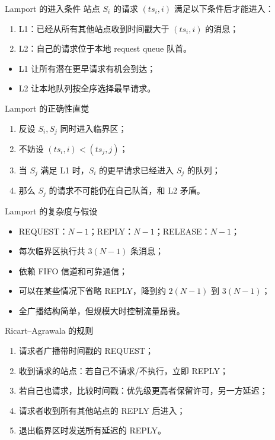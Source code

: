 \documentclass[UTF8,fontset=none,aspectratio=169,10pt]{beamer}
\begin{document}
\begin{frame}{Lamport 的进入条件}
站点 $S_i$ 的请求 $(ts_i,i)$ 满足以下条件后才能进入：
\begin{enumerate}
  \item L1：已经从所有其他站点收到时间戳大于 $(ts_i,i)$ 的消息；
  \item L2：自己的请求位于本地 request queue 队首。
\end{enumerate}
\vfill
\begin{itemize}
  \item L1 让所有潜在更早请求有机会到达；
  \item L2 让本地队列按全序选择最早请求。
\end{itemize}
\end{frame}

\begin{frame}{Lamport 的正确性直觉}
\begin{enumerate}
  \item 反设 $S_i,S_j$ 同时进入临界区；
  \item 不妨设 $(ts_i,i)<(ts_j,j)$；
  \item 当 $S_j$ 满足 L1 时，$S_i$ 的更早请求已经进入 $S_j$ 的队列；
  \item 那么 $S_j$ 的请求不可能仍在自己队首，和 L2 矛盾。
\end{enumerate}
\end{frame}

\begin{frame}{Lamport 的复杂度与假设}
\begin{itemize}
  \item REQUEST：$N-1$；REPLY：$N-1$；RELEASE：$N-1$；
  \item 每次临界区执行共 $3(N-1)$ 条消息；
  \item 依赖 FIFO 信道和可靠通信；
  \item 可以在某些情况下省略 REPLY，降到约 $2(N-1)$ 到 $3(N-1)$；
  \item 全广播结构简单，但规模大时控制流量昂贵。
\end{itemize}
\end{frame}


\begin{frame}{Ricart--Agrawala 的规则}
\begin{enumerate}
  \item 请求者广播带时间戳的 REQUEST；
  \item 收到请求的站点：若自己不请求/不执行，立即 REPLY；
  \item 若自己也请求，比较时间戳：优先级更高者保留许可，另一方延迟；
  \item 请求者收到所有其他站点的 REPLY 后进入；
  \item 退出临界区时发送所有延迟的 REPLY。
\end{enumerate}
\end{frame}
\end{document}
